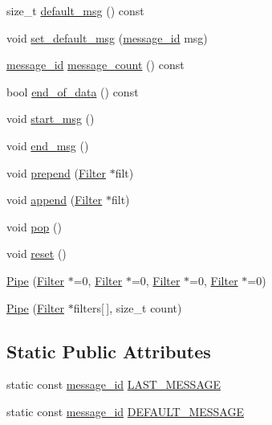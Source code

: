 \begin{DoxyCompactItemize}
\item 
size\-\_\-t \hyperlink{classBotan_1_1Pipe_a653cec95c56f9ac3db5eacc6c5920f04}{default\-\_\-msg} () const 
\item 
void \hyperlink{classBotan_1_1Pipe_ad4ca28641f32b2eaad59c6291aa1834c}{set\-\_\-default\-\_\-msg} (\hyperlink{classBotan_1_1Pipe_a122c19120c1c21f270b6b6225ca9883c}{message\-\_\-id} msg)
\item 
\hyperlink{classBotan_1_1Pipe_a122c19120c1c21f270b6b6225ca9883c}{message\-\_\-id} \hyperlink{classBotan_1_1Pipe_ace810f0ffa0f17cb9a950499cf58102f}{message\-\_\-count} () const 
\item 
bool \hyperlink{classBotan_1_1Pipe_ab530050320b9ee66d73062eda2026d8b}{end\-\_\-of\-\_\-data} () const 
\item 
void \hyperlink{classBotan_1_1Pipe_abbbb06ff9bc6ce0e8bcea06efe90d577}{start\-\_\-msg} ()
\item 
void \hyperlink{classBotan_1_1Pipe_a3fc8eab283184438cf09626ee5789f4b}{end\-\_\-msg} ()
\item 
void \hyperlink{classBotan_1_1Pipe_acb367a853312c55e5fac8e87b8ae3bd4}{prepend} (\hyperlink{classBotan_1_1Filter}{Filter} $\ast$filt)
\item 
void \hyperlink{classBotan_1_1Pipe_aabd2f8d3d29c3312e951b81b68b99545}{append} (\hyperlink{classBotan_1_1Filter}{Filter} $\ast$filt)
\item 
void \hyperlink{classBotan_1_1Pipe_a33c1c682e001dc5d6c4582e30156a033}{pop} ()
\item 
void \hyperlink{classBotan_1_1Pipe_acb364b8b2927bfeb89d4cf33304b7094}{reset} ()
\item 
\hyperlink{classBotan_1_1Pipe_a206e7c15080600d1b730941865960fd4}{Pipe} (\hyperlink{classBotan_1_1Filter}{Filter} $\ast$=0, \hyperlink{classBotan_1_1Filter}{Filter} $\ast$=0, \hyperlink{classBotan_1_1Filter}{Filter} $\ast$=0, \hyperlink{classBotan_1_1Filter}{Filter} $\ast$=0)
\item 
\hyperlink{classBotan_1_1Pipe_aa2268dc36c3950bb450c9ea05b8f2506}{Pipe} (\hyperlink{classBotan_1_1Filter}{Filter} $\ast$filters\mbox{[}$\,$\mbox{]}, size\-\_\-t count)
\end{DoxyCompactItemize}
\subsection*{Static Public Attributes}
\begin{DoxyCompactItemize}
\item 
static const \hyperlink{classBotan_1_1Pipe_a122c19120c1c21f270b6b6225ca9883c}{message\-\_\-id} \hyperlink{classBotan_1_1Pipe_a192a6452778feca6c4363a24b5612f46}{L\-A\-S\-T\-\_\-\-M\-E\-S\-S\-A\-G\-E}
\item 
static const \hyperlink{classBotan_1_1Pipe_a122c19120c1c21f270b6b6225ca9883c}{message\-\_\-id} \hyperlink{classBotan_1_1Pipe_a75278149a3ca86f19db144049cfa2ed3}{D\-E\-F\-A\-U\-L\-T\-\_\-\-M\-E\-S\-S\-A\-G\-E}
\end{DoxyCompactItemize}


